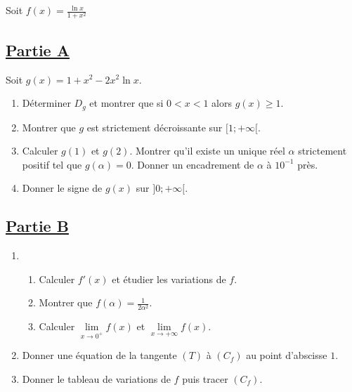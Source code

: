     \section*{}
    Soit \( f(x) = \frac{\ln x}{1 + x^2} \)

    \subsection*{\underline{\textbf{Partie A}}}

    Soit \( g(x) = 1 + x^2 - 2x^2 \ln x. \)

    \begin{enumerate}
        \item Déterminer \( D_g \) et montrer que si \( 0 < x < 1 \) alors \( g(x) \geq 1 \).
        \item Montrer que \( g \) est strictement décroissante sur \( [1; +\infty[ \).
        \item Calculer \( g(1) \) et \( g(2) \). Montrer qu’il existe un unique réel \( \alpha \) strictement positif tel que \( g(\alpha) = 0 \). Donner un encadrement de \( \alpha \) à \( 10^{-1} \) près.
        \item Donner le signe de \( g(x) \) sur \( ]0; +\infty[ \).
    \end{enumerate}

    \subsection*{\underline{\textbf{Partie B}}}

    \begin{enumerate}
        \item
              \begin{enumerate}
                  \item Calculer \( f'(x) \) et étudier les variations de \( f \).
                  \item Montrer que \( f(\alpha) = \frac{1}{2\alpha^2} \).
                  \item Calculer \( \lim\limits_{x \to 0^+} f(x) \) et \( \lim\limits_{x \to +\infty} f(x) \).
              \end{enumerate}
        \item Donner une équation de la tangente \( (T) \) à \( (C_f) \) au point d’abscisse \( 1 \).
        \item Donner le tableau de variations de \( f \) puis tracer \( (C_f) \).
    \end{enumerate}

